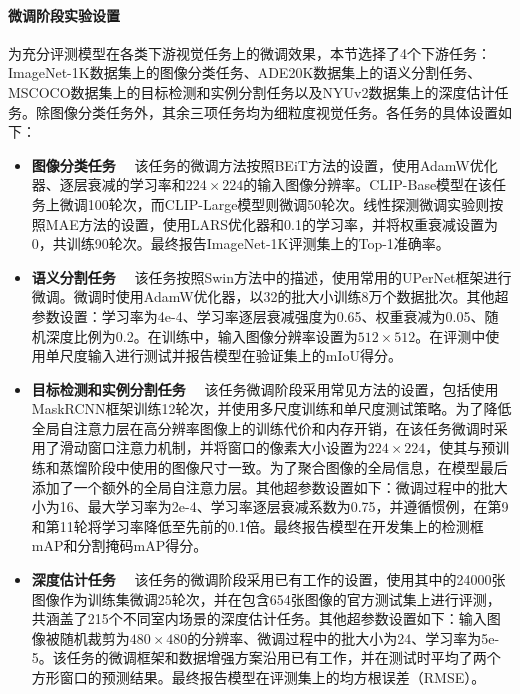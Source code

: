 \paragraph{微调阶段实验设置} 为充分评测模型在各类下游视觉任务上的微调效果，本节选择了4个下游任务：ImageNet-1K数据集\cite{deng2009imagenet}上的图像分类任务、ADE20K数据集\cite{zhou2019ade}上的语义分割任务、MSCOCO数据集\cite{chen2015microsoft}上的目标检测和实例分割任务以及NYUv2\cite{NYUv2}数据集上的深度估计任务。除图像分类任务外，其余三项任务均为细粒度视觉任务。各任务的具体设置如下：
\begin{itemize}
    \item \textbf{图像分类任务}~~ 该任务的微调方法按照BEiT\cite{bao2021beit}方法的设置，使用AdamW优化器\cite{adamw}、逐层衰减的学习率和$224 \times 224$的输入图像分辨率。CLIP-Base模型在该任务上微调100轮次，而CLIP-Large模型则微调50轮次。线性探测微调实验则按照MAE方法的设置，使用LARS优化器\cite{lars}和0.1的学习率，并将权重衰减设置为0，共训练90轮次。最终报告ImageNet-1K评测集上的Top-1准确率。
    \item \textbf{语义分割任务}~~  该任务按照Swin\cite{Swin}方法中的描述，使用常用的UPerNet框架\cite{xiao2018upernet}进行微调。微调时使用AdamW优化器，以32的批大小训练8万个数据批次。其他超参数设置：学习率为4e-4、学习率逐层衰减强度为0.65、权重衰减为0.05、随机深度比例为0.2。在训练中，输入图像分辨率设置为$512 \times 512$。在评测中使用单尺度输入进行测试并报告模型在验证集上的mIoU得分。
    \item \textbf{目标检测和实例分割任务}~~  该任务微调阶段采用常见方法\cite{cae}的设置，包括使用MaskRCNN框架\cite{Mask-rcnn}训练12轮次，并使用多尺度训练和单尺度测试策略。为了降低全局自注意力层在高分辨率图像上的训练代价和内存开销，在该任务微调时采用了滑动窗口注意力机制\cite{Swin}，并将窗口的像素大小设置为$224 \times 224$，使其与预训练和蒸馏阶段中使用的图像尺寸一致。为了聚合图像的全局信息，在模型最后添加了一个额外的全局自注意力层。其他超参数设置如下：微调过程中的批大小为16、最大学习率为2e-4、学习率逐层衰减系数为0.75，并遵循惯例，在第9和第11轮将学习率降低至先前的0.1倍。最终报告模型在开发集上的检测框mAP和分割掩码mAP得分。
    \item \textbf{深度估计任务}~~  该任务的微调阶段采用已有工作\cite{glpdepth, xie2023revealing}的设置，使用其中的24000张图像作为训练集微调25轮次，并在包含654张图像的官方测试集上进行评测，共涵盖了215个不同室内场景的深度估计任务。其他超参数设置如下：输入图像被随机裁剪为$480 \times 480$的分辨率、微调过程中的批大小为24、学习率为5e-5。该任务的微调框架和数据增强方案沿用已有工作\cite{xie2023revealing}，并在测试时平均了两个方形窗口的预测结果。最终报告模型在评测集上的均方根误差（RMSE）。
\end{itemize}

